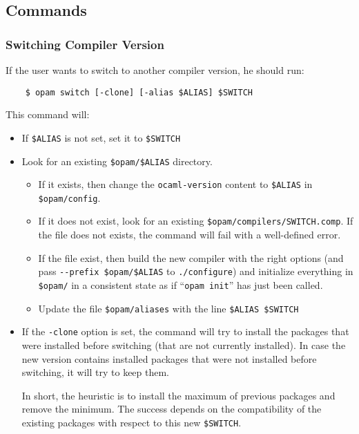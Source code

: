 \documentclass[a4paper,11pt]{article}
\begin{document}
\subsection{Commands}

\subsubsection{Switching Compiler Version}

If the user wants to switch to another compiler version, he should run:

\begin{verbatim}
    $ opam switch [-clone] [-alias $ALIAS] $SWITCH
\end{verbatim}

This command will:

\begin{itemize}

\item If \verb+$ALIAS+ is not set, set it to \verb+$SWITCH+

\item Look for an existing \verb+$opam/$ALIAS+ directory.

\begin{itemize}
\item If it
  exists, then change the {\tt ocaml-version} content to
  \verb+$ALIAS+ in  \verb+$opam/config+.

\item If it does not exist, look for an existing
  \verb+$opam/compilers/SWITCH.comp+. If the file does not exists,
  the command will fail with a well-defined error.

\item If the file exist, then build the new compiler with the right
  options (and pass \verb+--prefix $opam/$ALIAS+ to
  \verb+./configure+) and initialize everything in \verb+$opam/+
  in a consistent state as if ``\verb+opam init+'' has just been called.

\item Update the file \verb+$opam/aliases+ with the line
  \verb+$ALIAS $SWITCH+

\end{itemize}

\item If the \verb+-clone+ option is set, the command will try to install
  the packages that were installed before switching
  (that are not currently installed).
  In case the new version contains installed packages
  that were not installed before switching, it will try to keep them.

  In short, the heuristic is to install the maximum of previous packages
  and remove the minimum.
  The success depends on the compatibility of the existing packages
  with respect to this new \verb+$SWITCH+.

\end{itemize}
\end{document}
